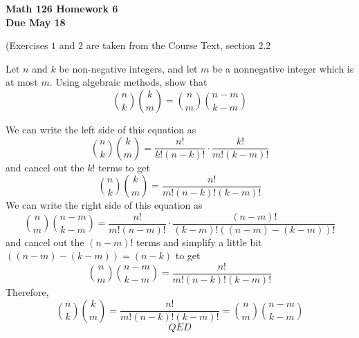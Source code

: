 \documentclass[11pt]{amsart}
\begin{document}
\begin{center}
\textbf{{\LARGE Math 126 Homework 6}  \\
{Due May 18}}
\end{center}

(Exercises $1$ and $2$ are taken from the Course Text, section 2.2


\begin{problem}

Let $n$ and $k$ be non-negative integers, and let $m$ be a nonnegative integer which is at most $m$.  Using algebraic methods, show that 
$$\binom{n}{k} \binom{k}{m} = \binom{n}{m} \binom{n-m}{k-m}$$
\end{problem}
\begin{solution}

We can write the left side of this equation as
$$\binom{n}{k}\binom{k}{m} = \frac{n!}{k!(n-k)!}\cdot\frac{k!}{m!(k-m)!}$$
and cancel out the $k!$ terms to get
$$\binom{n}{k}\binom{k}{m} = \frac{n!}{m!(n-k)!(k-m)!}$$
We can write the right side of this equation as
$$\binom{n}{m}\binom{n-m}{k-m} = \frac{n!}{m!(n-m)!}\cdot\frac{(n-m)!}{(k-m)!((n-m)-(k-m))!}$$
and cancel out the $(n-m)!$ terms and simplify a little bit $((n-m)-(k-m))=(n-k)$ to get
$$\binom{n}{m}\binom{n-m}{k-m} = \frac{n!}{m!(n-k)!(k-m)!}$$
Therefore,
$$\binom{n}{k}\binom{k}{m} = \frac{n!}{m!(n-k)!(k-m)!} = \binom{n}{m}\binom{n-m}{k-m}$$
$$QED$$
\end{solution}
\end{document}
